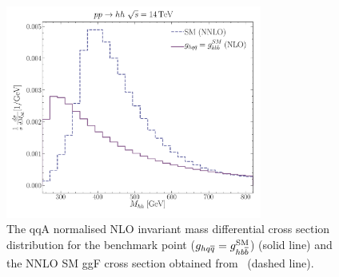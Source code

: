 \begin{figure}[!b]
	\centering
	\includegraphics[width = 0.75\textwidth]{./fig/uh_shnnlo_shape.pdf}
	\caption{The qqA normalised NLO invariant mass differential cross section distribution for the benchmark point ($g_{hq \overline q} = g_{h b \overline b}^{\mathrm{SM}}$) (solid line) and the NNLO SM ggF cross section obtained from~\cite{Grazzini:2018bsd} (dashed line).
		}
	\label{qqA_dsigdmhh}
\end{figure}

